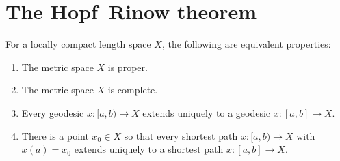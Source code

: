 \section{The Hopf--Rinow theorem}
\begin{theorem}\label{theorem:Hopf.Rinow.length.spaces}
For a locally compact length space \(X\), the following are equivalent properties:
\begin{enumerate}
\item
The metric space \(X\) is proper.
\item
The metric space \(X\) is complete.
\item
Every geodesic \(x \colon [a,b) \to X\) extends uniquely to a geodesic \(x \colon [a,b] \to X\).
\item
There is a point \(x_0 \in X\) so that every shortest path \(x \colon [a,b) \to X\) with \(x(a)=x_0\) extends uniquely to a shortest path \(x \colon [a,b] \to X\).
\end{enumerate}
\end{theorem}
